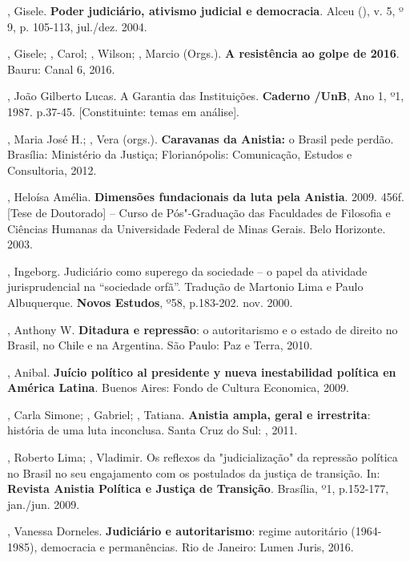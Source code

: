 , Gisele. \textbf{Poder judiciário, ativismo judicial e
democracia}. Alceu (), v. 5, º 9, p. 105-113, jul./dez. 2004.

, Gisele; , Carol;  , Wilson; , Marcio
(Orgs.). \textbf{A resistência ao golpe de 2016}. Bauru: Canal 6, 2016.

, João Gilberto Lucas. A Garantia das Instituições.
\textbf{Caderno /UnB}, Ano 1, º1, 1987. p.37-45. {[}Constituinte:
temas em análise{]}.

, Maria José H.; , Vera (orgs.). \textbf{Caravanas da
Anistia:} o Brasil pede perdão. Brasília: Ministério da Justiça;
Florianópolis: Comunicação, Estudos e Consultoria, 2012.

, Heloísa Amélia. \textbf{Dimensões fundacionais da luta pela
Anistia}. 2009. 456f. {[}Tese de Doutorado{]} -- Curso de Pós"-Graduação
das Faculdades de Filosofia e Ciências Humanas da Universidade Federal
de Minas Gerais. Belo Horizonte. 2003.

, Ingeborg. Judiciário como superego da sociedade -- o papel da
atividade jurisprudencial na ``sociedade orfã''. Tradução de Martonio Lima
e Paulo Albuquerque. \textbf{Novos Estudos}, º58, p.183-202. nov. 2000.

, Anthony W. \textbf{Ditadura e repressão}: o autoritarismo e o
estado de direito no Brasil, no Chile e na Argentina. São Paulo: Paz e
Terra, 2010.

, Anibal. \textbf{Juício político al presidente y nueva
inestabilidad política en América Latina}. Buenos Aires: Fondo de
Cultura Economica, 2009.

, Carla Simone; , Gabriel; , Tatiana.
\textbf{Anistia ampla, geral e irrestrita}: história de uma luta
inconclusa. Santa Cruz do Sul: , 2011.

, Roberto Lima;  , Vladimir. Os reflexos da
"judicialização" da repressão política no Brasil no seu engajamento com
os postulados da justiça de transição. In: \textbf{Revista Anistia
Política e Justiça de Transição}. Brasília, º1, p.152-177, jan./jun.
2009.

, Vanessa Dorneles. \textbf{Judiciário e autoritarismo}: regime
autoritário (1964-1985), democracia e permanências. Rio de Janeiro:
Lumen Juris, 2016.

